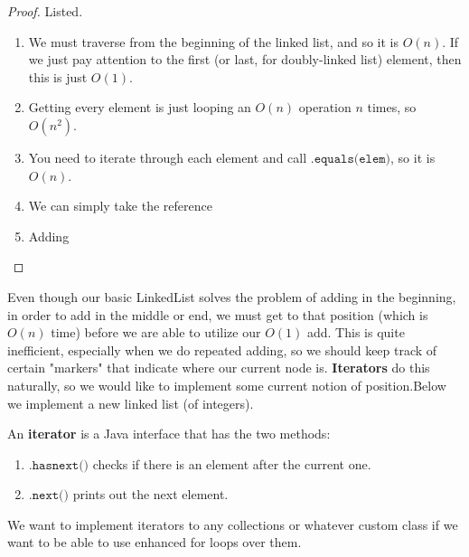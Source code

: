   \begin{proof}
  Listed. 
  \begin{enumerate}
      \item We must traverse from the beginning of the linked list, and so it is $O(n)$. If we just pay attention to the first (or last, for doubly-linked list) element, then this is just $O(1)$. 
      \item Getting every element is just looping an $O(n)$ operation $n$ times, so $O(n^2)$. 
      \item You need to iterate through each element and call $\texttt{.equals(elem)}$, so it is $O(n)$. 
      \item We can simply take the reference 
      \item Adding 
  \end{enumerate}
  \end{proof}

  Even though our basic LinkedList solves the problem of adding in the beginning, in order to add in the middle or end, we must get to that position (which is $O(n)$ time) before we are able to utilize our $O(1)$ add. This is quite inefficient, especially when we do repeated adding, so we should keep track of certain "markers" that indicate where our current node is. \textbf{Iterators} do this naturally, so we would like to implement some current notion of position.Below we implement a new linked list (of integers). 

  \begin{definition}[Iterator]
  An \textbf{iterator} is a Java interface that has the two methods: 
  \begin{enumerate}
      \item $\texttt{.hasnext()}$ checks if there is an element after the current one. 
      \item $\texttt{.next()}$ prints out the next element. 
  \end{enumerate}
  We want to implement iterators to any collections or whatever custom class if we want to be able to use enhanced for loops over them. 
  \end{definition}


